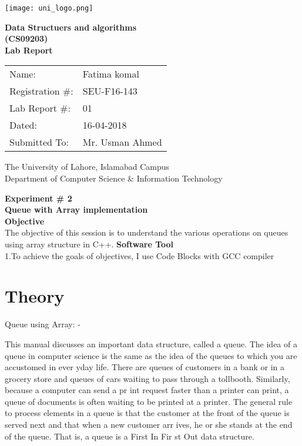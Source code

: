 \documentclass[11pt]{article}            %
\begin{document}
\begin{titlepage}
    \centering
  \vfill
    \texttt{[image: uni\_logo.png]} \\ 
	\vskip2cm
    {\bfseries\Large
	Data Structuers and algorithms \\ (CS09203)\\
	
	\vskip2cm
	Lab Report 
	 
	\vskip2cm
	}    

\begin{center}
\begin{tabular}{ l l  } 

Name: & Fatima komal \\ 
Registration \#: & SEU-F16-143 \\ 
Lab Report \#: & 01 \\ 
 Dated:& 16-04-2018\\ 
Submitted To:& Mr. Usman Ahmed\\ 

\end{tabular}
\end{center}
    \vfill
    The University of Lahore, Islamabad Campus\\
Department of Computer Science \& Information Technology
\end{titlepage}


    
    {\bfseries\Large
\centering
	Experiment \# 2 \\

Queue with Array implementation  \\
	
	}    
 \vskip1cm
 \textbf {Objective}\\The  objective  of  this  session  is  to  understand  the  various  operations  on  queues  using  array 
structure in C++.
 \textbf {Software Tool} \\
 1.To achieve the goals of objectives, I use Code Blocks with GCC compiler

\section{Theory }              

Queue using Array: - 
 
This  manual  discusses  an  important  data  structure,  called  a  queue.  The  idea of a  queue  in 
computer  science  is  the  same  as  the  idea  of  the  queues  to  which  you  are  accustomed  in 
ever yday life. There are queues of customers in a bank or in a grocery store and queues of cars 
waiting to pass through a tollbooth. Similarly, because a computer can send a pr int request faster 
than a printer can print, a queue of documents is often waiting to be printed at a printer. The 
general rule to process elements in a queue is that the customer at the front of the queue is served 
next and that when a new customer arr ives, he or she stands at the end of the queue. That is, a 
queue is a First In Fir st Out data structure. 
 
\end{document}
